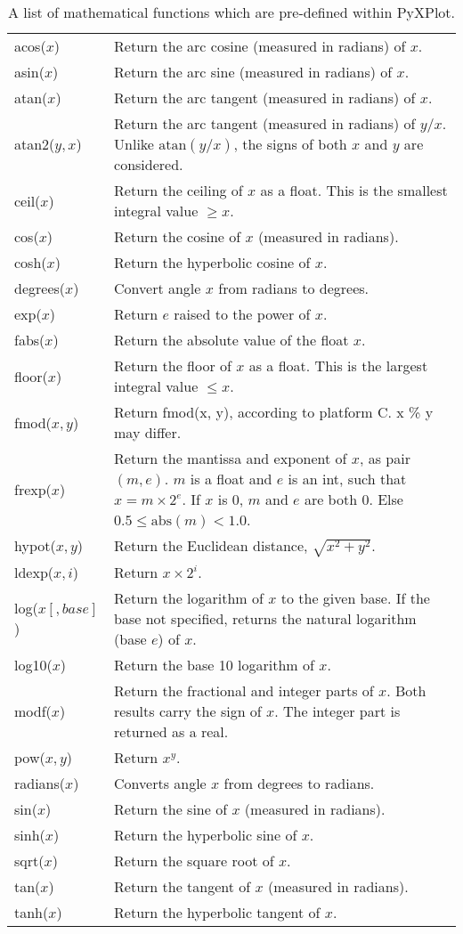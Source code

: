 \documentclass[a4paper,onecolumn,11pt]{book}
\begin{document}
\begin{table}
\begin{longtable}{|lp{8cm}|}
\hline
acos($x$)&
Return the arc cosine (measured in radians) of $x$.\\
asin($x$)&
Return the arc sine (measured in radians) of $x$.\\
atan($x$)&
Return the arc tangent (measured in radians) of $x$.\\
atan2($y,x$)&
Return the arc tangent (measured in radians) of $y/x$. Unlike $\mathrm{atan}(y/x)$, the signs of both $x$ and $y$ are considered.\\
ceil($x$)&
Return the ceiling of $x$ as a float. This is the smallest integral value $\geq x$.\\
cos($x$)&
Return the cosine of $x$ (measured in radians).\\
cosh($x$)&
Return the hyperbolic cosine of $x$.\\
degrees($x$)&
Convert angle $x$ from radians to degrees.\\
exp($x$)&
Return $e$ raised to the power of $x$.\\
fabs($x$)&
Return the absolute value of the float $x$.\\
floor($x$)&
Return the floor of $x$ as a float. This is the largest integral value $\leq x$.\\
fmod($x,y$)&
Return fmod(x, y), according to platform C.  x \% y may differ.\\
frexp($x$)&
Return the mantissa and exponent of $x$, as pair $(m,e)$. $m$ is a float and $e$ is an int, such that $x = m \times 2^e$. If $x$ is 0, $m$ and $e$ are both 0.  Else $0.5 \leq \mathrm{abs}(m) < 1.0$.\\
hypot($x,y$)&
Return the Euclidean distance, $\sqrt{x^2 + y^2}$.\\
ldexp($x, i$)&
Return $x \times 2^i$. \\
log($x[,base]$)&
Return the logarithm of $x$ to the given base. If the base not specified, returns the natural logarithm (base $e$) of $x$.\\
log10($x$)&
Return the base 10 logarithm of $x$.\\
modf($x$)&
Return the fractional and integer parts of $x$.  Both results carry the sign of $x$.  The integer part is returned as a real.\\
pow($x,y$)&
Return $x^y$.\\
radians($x$)&
Converts angle $x$ from degrees to radians.\\
sin($x$)&
Return the sine of $x$ (measured in radians).\\
sinh($x$)&
Return the hyperbolic sine of $x$.\\
sqrt($x$)&
Return the square root of $x$.\\
tan($x$)&
Return the tangent of $x$ (measured in radians).\\
tanh($x$)&
Return the hyperbolic tangent of $x$.\\
\hline
\end{longtable}
\caption{A list of mathematical functions which are pre-defined within PyXPlot.}
\label{functions_table}
\end{table}
\end{document}
